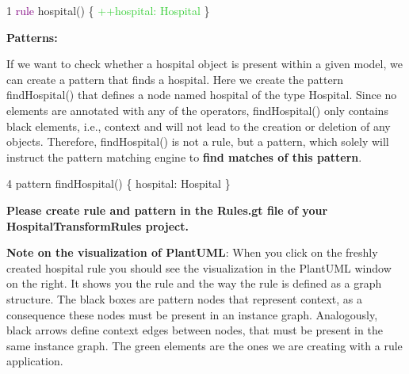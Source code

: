 {

1  \hspace{0.5cm}  \textcolor{Purple}{rule} hospital() \{  \hspace{1cm}  \textcolor{LimeGreen}{++hospital: Hospital}  \hspace{0.5cm}  \}\newline

}

\textbf{Patterns:}

If we want to check whether a hospital object is present within a given model, we can create a pattern that finds a hospital. Here we create the pattern \textsf{findHospital()} that defines a node named hospital of the type Hospital. Since no elements are annotated with any of the operators, findHospital() only contains black elements, i.e., context and will not lead to the creation or deletion of any objects.\newline
Therefore, findHospital() is not a rule, but a pattern, which solely will instruct the pattern matching engine to \textbf{find matches of this pattern}.\newline

{

4 \hspace{0.5cm}	{\color{Purple}pattern} findHospital() \{ \hspace{1cm}	hospital: Hospital \hspace{0.5cm}	\}\newline

}

\textbf{Please create rule and pattern in the \textsf{Rules.gt} file of your \textsf{HospitalTransformRules} project.}\newline


\textbf{Note on the visualization of PlantUML}:
\newline
When you click on the freshly created hospital rule you should see the visualization in the PlantUML window on the right. It shows you the rule and the way the rule is defined as a graph structure. The black boxes are pattern nodes that represent context, as a consequence these nodes must be present in an instance graph. Analogously, black arrows define context edges between nodes, that must be present in the same instance graph. The green elements are the ones we are creating with a rule application.

